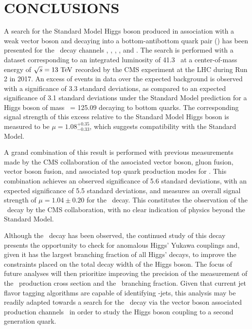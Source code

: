 \chapter{CONCLUSIONS} \label{conclusions}

A search for the Standard Model Higgs boson produced in association with a weak vector boson and decaying into a bottom-antibottom quark pair (\bb) has been presented for the \VHbb\ decay channels \ZnnHbb, \WenHbb, \WmnHbb, \ZeeHbb, and \ZmmHbb. The search is performed with a dataset corresponding to an integrated luminosity of 41.3 \invfb\ at a center-of-mass energy of $\sqrt{s} = 13\ \mathrm{TeV}$ recorded by the CMS experiment at the LHC during Run 2 in 2017. An excess of events in data over the expected background is observed with a significance of 3.3 standard deviations, as compared to an expected significance of 3.1 standard deviations under the Standard Model prediction for a Higgs boson of mass \massH\ = 125.09 \GeV decaying to bottom quarks. The corresponding signal strength of this excess relative to the Standard Model Higgs boson is measured to be $\mu = 1.08_{-0.33}^{+0.35}$, which suggests compatibility with the Standard Model.

A grand combination of this result is performed with previous measurements made by the CMS collaboration of the associated vector boson, gluon fusion, vector boson fusion, and associated top quark production modes for \Htobb. This combination achieves an observed significance of 5.6 standard deviations, with an expected significance of 5.5 standard deviations, and measures an overall signal strength of $\mu = 1.04 \pm 0.20$ for the \Htobb\ decay. This constitutes the observation of the \Htobb\ decay by the CMS collaboration, with no clear indication of physics beyond the Standard Model.

Although the \Htobb\ decay has been observed, the continued study of this decay presents the opportunity to check for anomalous Higgs' Yukawa couplings and, given it has the largest branching fraction of all Higgs' decays, to improve the constraints placed on the total decay width of the Higgs boson. The focus of future analyses will then prioritize improving the precision of the measurement of the \VHbb\ production cross section and the \Htobb\ branching fraction. Given that current jet flavor tagging algorithms are capable of identifying \qrkc-jets, this analysis may be readily adapted towards a search for the \Htocc\ decay via the vector boson associated production channels \VHcc\ in order to study the Higgs boson coupling to a second generation quark. 

